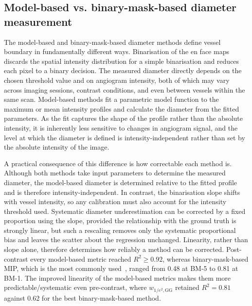 
\subsection{Model-based vs. binary-mask-based diameter measurement}
\label{subsec:model_vs_binary}
The model-based and binary-mask-based diameter methods define vessel boundary in fundamentally different ways. Binarisation of the en face maps discards the spatial intensity distribution for a simple binarisation and reduces each pixel to a binary decision. The measured diameter directly depends on the chosen threshold value and on angiogram intensity, both of which may vary across imaging sessions, contrast conditions, and even between vessels within the same scan. Model-based methods fit a parametric model function to the maximum or mean intensity profiles and calculate the diameter from the fitted parameters. As the fit captures the shape of the profile rather than the absolute intensity, it is inherently less sensitive to changes in angiogram signal, and the level at which the diameter is defined is intensity-independent rather than set by the absolute intensity of the image.

A practical consequence of this difference is how correctable each method is. Although both methods take input parameters to determine the measured diameter, the model-based diameter is determined relative to the fitted profile and is therefore intensity-independent. In contrast, the binarisation slope shifts with vessel intensity, so any calibration must also account for the intensity threshold used. Systematic diameter underestimation can be corrected by a fixed proportion using the slope, provided the relationship with the ground truth is strongly linear, but such a rescaling removes only the systematic proportional bias and leaves the scatter about the regression unchanged. Linearity, rather than slope alone, therefore determines how reliably a method can be corrected. Post-contrast every model-based metric reached $R^2 \geq 0.92$, whereas binary-mask-based MIP, which is the most commonly used~\cite{sampsonTowardsStandardizingRetinal2022,untrachtTowardsStandardisingRetinal2024}, ranged from 0.48 at BM-5 to 0.81 at BM-1. The improved linearity of the model-based metrics makes them more predictable/systematic even pre-contrast, where $w_{1/e^2,\mathrm{GG}}$ retained $R^2 = 0.81$ against 0.62 for the best binary-mask-based method.

